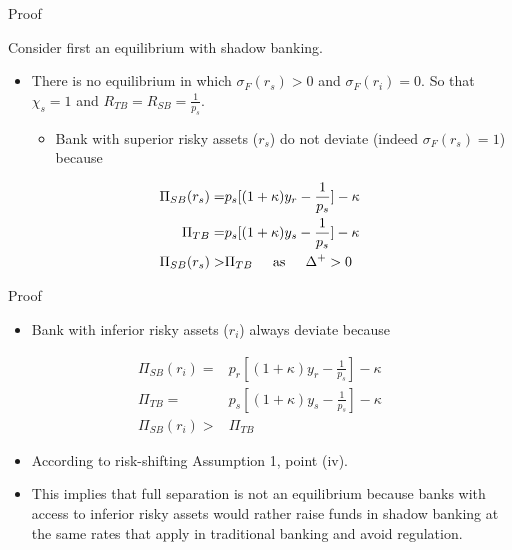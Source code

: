 \documentclass[
  ignorenonframetext,
]{beamer}
\providecommand{\tightlist}{%
  \setlength{\itemsep}{0pt}\setlength{\parskip}{0pt}}
\begin{document}
\begin{frame}{Proof}
\protect\hypertarget{proof}{}

Consider first an equilibrium with shadow banking.

\begin{itemize}
\item
  There is no equilibrium in which \(\sigma_{F}(r_{s})>0\) and
  \(\sigma_{F}(r_{i})=0\). So that \(\chi_{s}=1\) and
  \(R_{TB}=R_{SB}=\frac{1}{p_{s}}\).

  \begin{itemize}
  \tightlist
  \item
    Bank with superior risky assets (\(r_{s}\)) do not deviate (indeed
    \(\sigma_{F}(r_{s})=1\)) because
  \end{itemize}
\end{itemize}

\[
\begin{align*}
\Pi_{SB}(r_{s})=&p_{s}[(1+\kappa)y_{r}-\frac{1}{p_{s}}]-\kappa\\ 
\Pi_{TB}=&p_{s}[(1+\kappa)y_{s}-\frac{1}{p_{s}}]-\kappa\\
\Pi_{SB}(r_{s})>&\Pi_{TB}\hspace{.2in}\text{as}\hspace{.2in}\Delta^+>0
\end{align*}
\]

\end{frame}

\begin{frame}{Proof}
\protect\hypertarget{proof-1}{}

\begin{itemize}
\tightlist
\item
  Bank with inferior risky assets (\(r_{i}\)) always deviate because
\end{itemize}

\[
\begin{align*}
\Pi_{SB}(r_{i})=&p_{r}[(1+\kappa)y_{r}-\frac{1}{p_{s}}]-\kappa\\
\Pi_{TB}=&p_{s}[(1+\kappa)y_{s}-\frac{1}{p_{s}}]-\kappa\\
\Pi_{SB}(r_{i})>&\Pi_{TB}
\end{align*}
\]

\begin{itemize}
\tightlist
\item
  According to risk-shifting Assumption 1, point (iv).
\item
  This implies that full separation is not an equilibrium because banks
  with access to inferior risky assets would rather raise funds in
  shadow banking at the same rates that apply in traditional banking and
  avoid regulation.
\end{itemize}

\end{frame}
\end{document}
